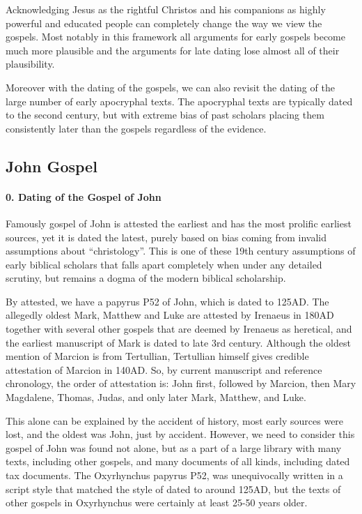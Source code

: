 Acknowledging Jesus as the rightful Christos and his companions as highly powerful and educated people can completely change the way we view the gospels.
Most notably in this framework all arguments for early gospels become much more plausible and the arguments for late dating lose almost all of their plausibility.

Moreover with the dating of the gospels, we can also revisit the dating of the large number of early apocryphal texts.
The apocryphal texts are typically dated to the second century, but with extreme bias of past scholars placing them consistently later than the gospels regardless of the evidence.

\subsection{John Gospel}\label{subsec:john-gospel}

\paragraph{0.
Dating of the Gospel of John}\label{par:dating-of-the-gospel-of-john}

Famously gospel of John is attested the earliest and has the most prolific earliest sources, yet it is dated the latest, purely based on bias coming from invalid assumptions about ``christology''.
This is one of these 19th century assumptions of early biblical scholars that falls apart completely when under any detailed scrutiny, but remains a dogma of the modern biblical scholarship.

By attested, we have a papyrus P52 of John, which is dated to 125AD.
The allegedly oldest Mark, Matthew and Luke are attested by Irenaeus in 180AD together with several other gospels that are deemed by Irenaeus as heretical, and the earliest manuscript of Mark is dated to late 3rd century.
Although the oldest mention of Marcion is from Tertullian, Tertullian himself gives credible attestation of Marcion in 140AD.
So, by current manuscript and reference chronology, the order of attestation is: John first, followed by Marcion, then Mary Magdalene, Thomas, Judas, and only later Mark, Matthew, and Luke.

This alone can be explained by the accident of history, most early sources were lost, and the oldest was John, just by accident.
However, we need to consider this gospel of John was found not alone, but as a part of a large library with many texts, including other gospels, and many documents of all kinds, including dated tax documents.
The Oxyrhynchus papyrus P52, was unequivocally written in a script style that matched the style of dated to around 125AD, but the texts of other gospels in Oxyrhynchus were certainly at least 25-50 years older.

